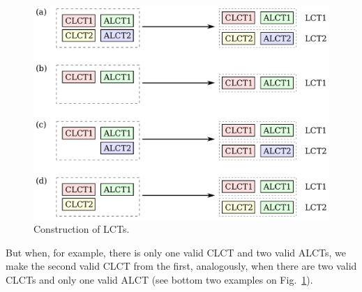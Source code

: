 \begin{figure}[tbh]
        \begin{center}
                \includegraphics[width=0.7\linewidth]{figures/clct_alct_corr.pdf}
                \caption{Construction of LCTs.}
                \label{fig:clct_alct_corr}
        \end{center}
\end{figure}

But when, for example, there is only one valid CLCT and two valid ALCTs, we make the second valid CLCT from the first, analogously, when there are two valid CLCTs and only one valid ALCT (see bottom two examples on Fig.~\ref{fig:clct_alct_corr}).